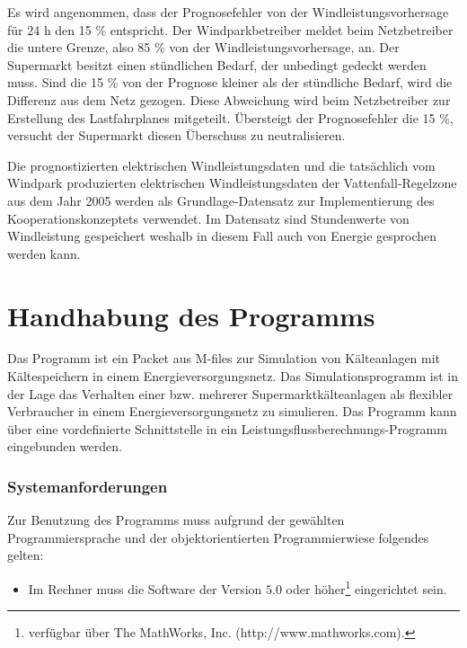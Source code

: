Es wird angenommen, dass der Prognosefehler von der Windleistungsvorhersage
f\"ur 24 h den 15 \% entspricht. Der Windparkbetreiber meldet beim Netzbetreiber
die untere Grenze, also 85 \% von der Windleistungsvorhersage, an. Der
Supermarkt besitzt einen st\"undlichen Bedarf, der unbedingt gedeckt werden
muss. Sind die 15 \% von der Prognose kleiner als der st\"undliche Bedarf, wird
die Differenz aus dem Netz gezogen. Diese Abweichung wird beim Netzbetreiber zur
Erstellung des Lastfahrplanes mitgeteilt. \"Ubersteigt der Prognosefehler die 15
\%, versucht der Supermarkt diesen \"Uberschuss zu neutralisieren.

Die prognostizierten elektrischen Windleistungsdaten und die tatsächlich vom
Windpark produzierten elektrischen Windleistungsdaten der Vattenfall-Regelzone
 aus dem Jahr 2005 werden als Grundlage-Datensatz zur
Implementierung des Kooperationskonzeptets verwendet. Im Datensatz sind
Stundenwerte von Windleistung gespeichert weshalb in diesem Fall auch von
Energie gesprochen werden kann.


\section{Handhabung des Programms}
\label{sc:handhabung}

Das Programm ist ein Packet aus \matlab M-files zur Simulation von Kälteanlagen
mit Kältespeichern in einem Energieversorgungsnetz. Das Simulationsprogramm ist
in der Lage das Verhalten einer bzw. mehrerer Supermarktkälteanlagen als
flexibler Verbraucher in einem Energieversorgungsnetz zu simulieren. Das
Programm kann über eine vordefinierte Schnittstelle in ein
Leistungsflussberechnungs-Programm eingebunden werden.

\subsubsection{Systemanforderungen}

Zur Benutzung des Programms muss aufgrund der gewählten Programmiersprache und
der objektorientierten Programmierwiese folgendes gelten:

\begin{itemize}
	\item Im Rechner muss die Software \matlab der Version $5.0$ oder
	höher\footnote{ \matlab verfügbar über The MathWorks, Inc.
	(http://www.mathworks.com).} eingerichtet sein.
\end{itemize}

